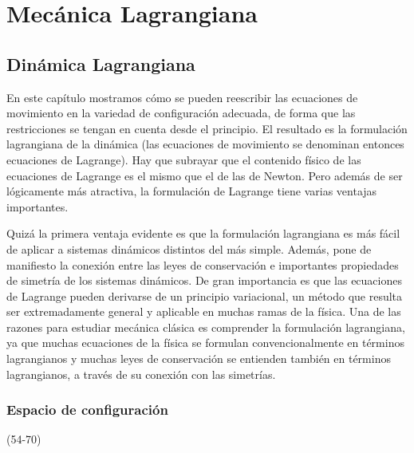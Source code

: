 \setchapterpreamble[u]{\margintoc}
\chapter{Mecánica Lagrangiana}

\section{Dinámica Lagrangiana}
En este capítulo mostramos cómo se pueden reescribir las ecuaciones de movimiento en la variedad de configuración adecuada, de forma que las restricciones se tengan en cuenta desde el principio. El resultado es la formulación lagrangiana de la dinámica (las ecuaciones de movimiento se denominan entonces ecuaciones de Lagrange). Hay que subrayar que el contenido físico de las ecuaciones de Lagrange es el mismo que el de las de Newton. Pero además de ser lógicamente más atractiva, la formulación de Lagrange tiene varias ventajas importantes.

Quizá la primera ventaja evidente es que la formulación lagrangiana es más fácil de aplicar a sistemas dinámicos distintos del más simple. Además, pone de manifiesto la conexión entre las leyes de conservación e importantes propiedades de simetría de los sistemas dinámicos. De gran importancia es que las ecuaciones de Lagrange pueden derivarse de un principio variacional, un método que resulta ser extremadamente general y aplicable en muchas ramas de la física. Una de las razones para estudiar mecánica clásica es comprender la formulación lagrangiana, ya que muchas ecuaciones de la física se formulan convencionalmente en términos lagrangianos y muchas leyes de conservación se entienden también en términos lagrangianos, a través de su conexión con las simetrías.

\subsection{Espacio de configuración}
(54-70)

